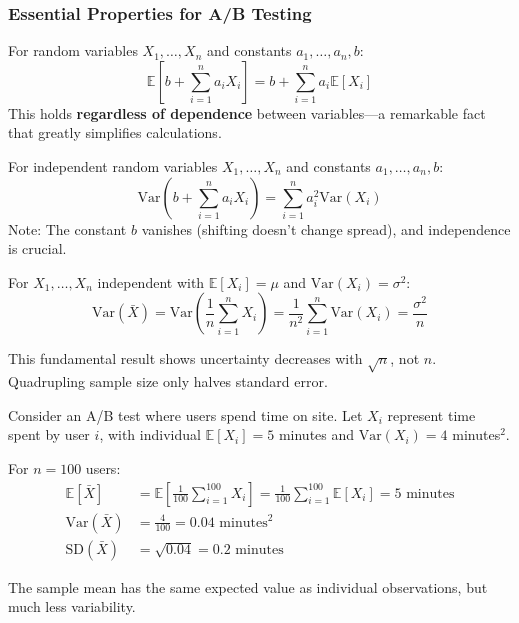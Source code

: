 \subsubsection{Essential Properties for A/B Testing}

\begin{proposition}
For random variables $X_1, \ldots, X_n$ and constants $a_1, \ldots, a_n, b$:
\begin{equation}
\mathbb{E}\left[b + \sum_{i=1}^n a_i X_i\right] = b + \sum_{i=1}^n a_i \mathbb{E}[X_i]
\end{equation}
This holds \textbf{regardless of dependence} between variables—a remarkable fact that greatly simplifies calculations.
\end{proposition}

\begin{proposition}
For independent random variables $X_1, \ldots, X_n$ and constants $a_1, \ldots, a_n, b$:
\begin{equation}
\text{Var}\left(b + \sum_{i=1}^n a_i X_i\right) = \sum_{i=1}^n a_i^2 \text{Var}(X_i)
\end{equation}
Note: The constant $b$ vanishes (shifting doesn't change spread), and independence is crucial.
\end{proposition}

\begin{corollary}
For $X_1, \ldots, X_n$ independent with $\mathbb{E}[X_i] = \mu$ and $\text{Var}(X_i) = \sigma^2$:
\begin{equation}
\text{Var}(\bar{X}) = \text{Var}\left(\frac{1}{n}\sum_{i=1}^n X_i\right) = \frac{1}{n^2} \sum_{i=1}^n \text{Var}(X_i) = \frac{\sigma^2}{n}
\end{equation}

This fundamental result shows uncertainty decreases with $\sqrt{n}$, not $n$. Quadrupling sample size only halves standard error.
\end{corollary}

\begin{example}
Consider an A/B test where users spend time on site. Let $X_i$ represent time spent by user $i$, with individual $\mathbb{E}[X_i] = 5$ minutes and $\text{Var}(X_i) = 4$ minutes$^2$.

For $n = 100$ users:
\begin{align}
\mathbb{E}[\bar{X}] &= \mathbb{E}\left[\frac{1}{100}\sum_{i=1}^{100} X_i\right] = \frac{1}{100}\sum_{i=1}^{100} \mathbb{E}[X_i] = 5 \text{ minutes}\\
\text{Var}(\bar{X}) &= \frac{4}{100} = 0.04 \text{ minutes}^2 \\
\text{SD}(\bar{X}) &= \sqrt{0.04} = 0.2 \text{ minutes}
\end{align}

The sample mean has the same expected value as individual observations, but much less variability.
\end{example}


